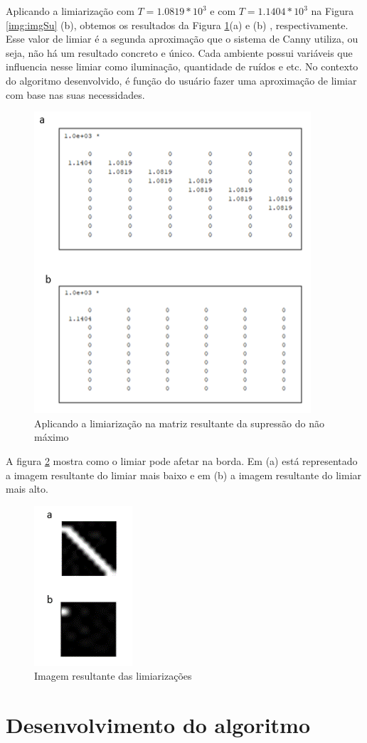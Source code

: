 \documentclass[a4paper,alpha-refs]{RBCA_v1.0}
\begin{document}
Aplicando a limiarização com $T =  1.0819 * 10^3$ e com $T =  1.1404 * 10^3$  na Figura \ref{img:imgSu} (b), obtemos os resultados da Figura \ref{img:imgLi}(a) e (b) , respectivamente. Esse valor de limiar é a segunda aproximação que o sistema de Canny utiliza, ou seja, não há um resultado concreto e único. Cada ambiente possui variáveis que influencia nesse limiar como iluminação, quantidade de ruídos e etc. No contexto do algoritmo desenvolvido, é função do usuário fazer uma aproximação de limiar com base nas suas necessidades.

\begin{figure}[h!]
	\centering
	\includegraphics[width=.5\textwidth]{img/imgLi.png}
	\caption{Aplicando a limiarização na matriz resultante da supressão do não máximo}
	\label{img:imgLi}
\end{figure}

A figura \ref{img:imgLi2} mostra como o limiar pode afetar na borda. Em (a) está representado a imagem resultante do limiar mais baixo e em (b) a imagem resultante do limiar mais alto.  

\begin{figure}[h!]
	\centering
	\includegraphics[width=.2\textwidth]{img/imgLi2.png}
	\caption{Imagem resultante das limiarizações}
	\label{img:imgLi2}
\end{figure}
 
\section{Desenvolvimento do algoritmo}
\end{document}
